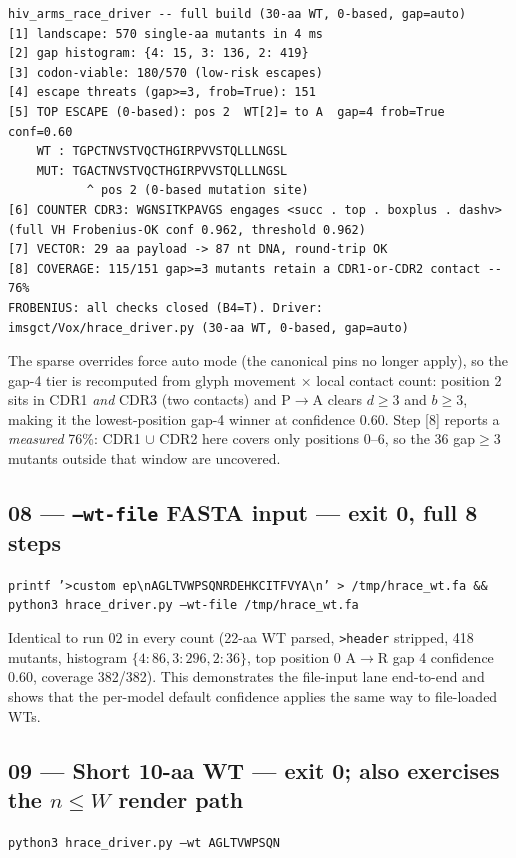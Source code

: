 \documentclass{article}
\begin{document}
\begin{lstlisting}
hiv_arms_race_driver -- full build (30-aa WT, 0-based, gap=auto)
[1] landscape: 570 single-aa mutants in 4 ms
[2] gap histogram: {4: 15, 3: 136, 2: 419}
[3] codon-viable: 180/570 (low-risk escapes)
[4] escape threats (gap>=3, frob=True): 151
[5] TOP ESCAPE (0-based): pos 2  WT[2]= to A  gap=4 frob=True conf=0.60
    WT : TGPCTNVSTVQCTHGIRPVVSTQLLLNGSL
    MUT: TGACTNVSTVQCTHGIRPVVSTQLLLNGSL
           ^ pos 2 (0-based mutation site)
[6] COUNTER CDR3: WGNSITKPAVGS engages <succ . top . boxplus . dashv> (full VH Frobenius-OK conf 0.962, threshold 0.962)
[7] VECTOR: 29 aa payload -> 87 nt DNA, round-trip OK
[8] COVERAGE: 115/151 gap>=3 mutants retain a CDR1-or-CDR2 contact -- 76%
FROBENIUS: all checks closed (B4=T). Driver: imsgct/Vox/hrace_driver.py (30-aa WT, 0-based, gap=auto)
\end{lstlisting}

The sparse overrides force auto mode (the canonical pins no longer apply), so
the gap-4 tier is recomputed from glyph movement \(\times\) local contact count:
position 2 sits in CDR1 \emph{and} CDR3 (two contacts) and P\(\to\)A clears
\(d \geq 3\) and \(b \geq 3\), making it the lowest-position gap-4 winner at
confidence 0.60. Step [8] reports a \emph{measured} 76\%: CDR1 \(\cup\) CDR2
here covers only positions 0--6, so the 36 gap\(\geq\)3 mutants outside that
window are uncovered.

\subsection*{08 --- \texttt{--wt-file} FASTA input --- exit 0, full 8 steps}
\texttt{printf '>custom ep\textbackslash nAGLTVWPSQNRDEHKCITFVYA\textbackslash n' > /tmp/hrace\_wt.fa \&\& python3 hrace\_driver.py --wt-file /tmp/hrace\_wt.fa}

Identical to run 02 in every count (22-aa WT parsed, \texttt{>header} stripped,
418 mutants, histogram \(\{4:86, 3:296, 2:36\}\), top position 0 A\(\to\)R gap 4
confidence 0.60, coverage 382/382). This demonstrates the file-input lane
end-to-end and shows that the per-model default confidence applies the same way
to file-loaded WTs.

\subsection*{09 --- Short 10-aa WT --- exit 0; also exercises the \(n \leq W\) render path}
\texttt{python3 hrace\_driver.py --wt AGLTVWPSQN}
\end{document}
